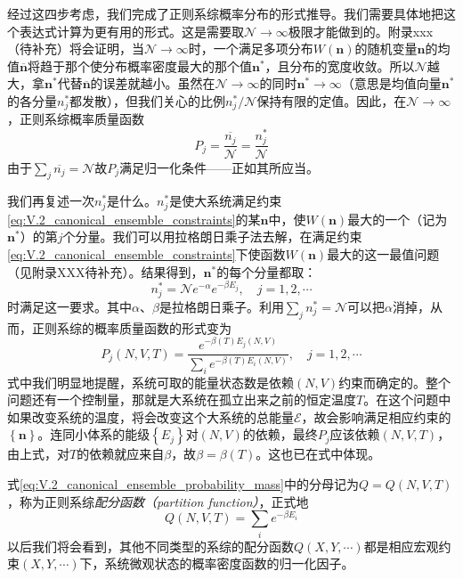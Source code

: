 \documentclass[main.tex]{subfiles}
\begin{document}
经过这四步考虑，我们完成了正则系综概率分布的形式推导。我们需要具体地把这个表达式计算为更有用的形式。这是需要取$\mathcal{N}\rightarrow\infty$极限才能做到的。附录xxx（待补充）将会证明，当$\mathcal{N}\rightarrow\infty$时，一个满足多项分布$W\left(\mathbf{n}\right)$的随机变量$\mathbf{n}$的均值$\overline{\mathbf{n}}$将趋于那个使分布概率密度最大的那个值$\mathbf{n}^*$，且分布的宽度收敛。所以$\mathcal{N}$越大，拿$\mathbf{n}^*$代替$\overline{\mathbf{n}}$的误差就越小。虽然在$\mathcal{N}\rightarrow\infty$的同时$\mathbf{n}^*\rightarrow\infty$（意思是均值向量$\mathbf{n}^*$的各分量$n_j^*$都发散），但我们关心的比例$n_j^*/\mathcal{N}$保持有限的定值。因此，在$\mathcal{N}\rightarrow\infty$，正则系综概率质量函数
\[P_j=\frac{\overline{n_j}}{\mathcal{N}}=\frac{n_j^*}{\mathcal{N}}\]
由于$\sum_j\overline{n_j}=\mathcal{N}$故$P_j$满足归一化条件——正如其所应当。

我们再复述一次$n_j^*$是什么。$n_j^*$是使大系统满足约束\eqref{eq:V.2_canonical_ensemble_constraints}的某$\mathbf{n}$中，使$W\left(\mathbf{n}\right)$最大的一个（记为$\mathbf{n}^*$）的第$j$个分量。我们可以用拉格朗日乘子法去解，在满足约束\eqref{eq:V.2_canonical_ensemble_constraints}下使函数$W\left(\mathbf{n}\right)$最大的这一最值问题（见附录XXX待补充）。结果得到，$\mathbf{n}^*$的每个分量都取：
\[n_j^*=\mathcal{N}e^{-\alpha}e^{-\beta E_j},\quad j=1,2,\cdots\]
时满足这一要求。其中$\alpha$、$\beta$是拉格朗日乘子。利用$\sum_jn_j^*=\mathcal{N}$可以把$\alpha$消掉，从而，正则系综的概率质量函数的形式变为
\begin{equation}\label{eq:V.2_canonical_ensemble_probability_mass}
    P_j\left(N,V,T\right)=\frac{e^{-\beta\left(T\right) E_j\left(N,V\right)}}{\sum_ie^{-\beta\left(T\right) E_i\left(N,V\right)}},\quad j=1,2,\cdots
\end{equation}
式中我们明显地提醒，系统可取的能量状态数是依赖$\left(N,V\right)$约束而确定的。整个问题还有一个控制量，那就是大系统在孤立出来之前的恒定温度$T$。在这个问题中如果改变系统的温度，将会改变这个大系统的总能量$\mathcal{E}$，故会影响满足相应约束的$\left\{\mathbf{n}\right\}$。连同小体系的能级$\left\{E_j\right\}$对$\left(N,V\right)$的依赖，最终$P_j$应该依赖$\left(N,V,T\right)$，由上式，对$T$的依赖就应来自$\beta$，故$\beta=\beta\left(T\right)$。这也已在式中体现。

式\eqref{eq:V.2_canonical_ensemble_probability_mass}中的分母记为$Q=Q\left(N,V,T\right)$，称为正则系综\emph{配分函数（partition function）}，正式地
\[Q\left(N,V,T\right)=\sum_ie^{-\beta E_i}\]
以后我们将会看到，其他不同类型的系综的配分函数$Q\left(X,Y,\cdots\right)$都是相应宏观约束$\left(X,Y,\cdots\right)$下，系统微观状态的概率密度函数的归一化因子。
\end{document}
